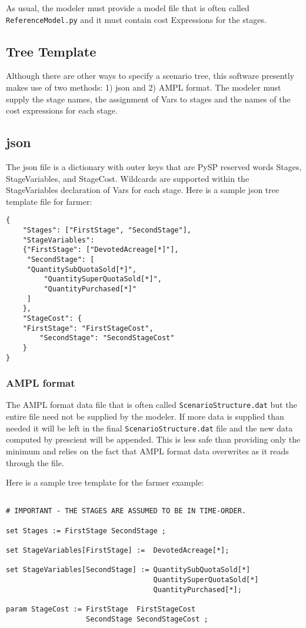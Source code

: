 \documentclass[12pt]{article}
\begin{document}
As usual, the modeler must
provide a model file that is often called \verb|ReferenceModel.py| and
it must contain cost Expressions for the stages.

\subsection{Tree Template}

Although there are other ways to specify a scenario tree, this
software presently makes use of two methods: 1) json and 2) AMPL format.
The modeler must supply the stage names,
the assignment of Vars to stages and the names of the cost expressions
for each stage.

\subsection{json}

The json file is a dictionary with outer keys that are PySP reserved
words Stages, StageVariables, and StageCost. Wildcards are supported
within the StageVariables declaration of Vars for each stage.  Here is
a sample json tree template file for farmer:

\begin{verbatim}
{
    "Stages": ["FirstStage", "SecondStage"],
    "StageVariables":
    {"FirstStage": ["DevotedAcreage[*]"],
     "SecondStage": [
	 "QuantitySubQuotaSold[*]",
         "QuantitySuperQuotaSold[*]",
         "QuantityPurchased[*]"
     ]
    },
    "StageCost": {
	"FirstStage": "FirstStageCost",
        "SecondStage": "SecondStageCost"
    }
}

\end{verbatim}

\subsubsection{AMPL format}

The AMPL format data file that is
often called \verb|ScenarioStructure.dat| but the entire file need not
be supplied by the modeler.  If more data is supplied than needed it will be left in the final
\verb|ScenarioStructure.dat| file and the new data computed by
prescient will be appended. This is less safe than providing only the
minimum and relies on the fact that AMPL format data overwrites as it
reads through the file.

Here is a sample tree template for the farmer example:

\begin{verbatim}

# IMPORTANT - THE STAGES ARE ASSUMED TO BE IN TIME-ORDER.

set Stages := FirstStage SecondStage ;

set StageVariables[FirstStage] :=  DevotedAcreage[*];

set StageVariables[SecondStage] := QuantitySubQuotaSold[*]
                                   QuantitySuperQuotaSold[*]
                                   QuantityPurchased[*];

param StageCost := FirstStage  FirstStageCost
                   SecondStage SecondStageCost ;
\end{verbatim}
\end{document}

